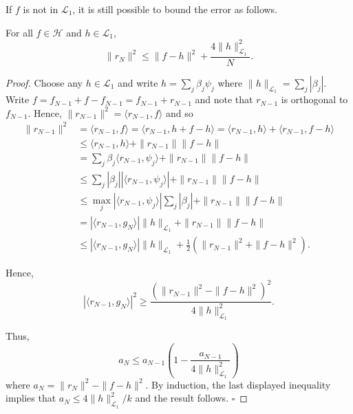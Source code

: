   If $f$ is not in $\mathcal{L}_1$, it is still possible to bound the error as follows.

  \begin{theorem}
    For all $f \in \mathcal{H}$ and $h \in \mathcal{L}_1$,
    \begin{equation}
      \|r_N\|^2 \leq \|f - h\|^2 + \frac{4\|h\|_{\mathcal{L}_1}^2}{N}. \tag{6}
    \end{equation}
  \end{theorem}
  \begin{proof}
    Choose any $h \in \mathcal{L}_1$ and write $h = \sum_j \beta_j \psi_j$ where $\|h\|_{\mathcal{L}_1} = \sum_j |\beta_j|$. Write $f = f_{N-1} + f - f_{N-1} = f_{N-1} + r_{N-1}$ and note that $r_{N-1}$ is orthogonal to $f_{N-1}$. Hence, $\|r_{N-1}\|^2 = \langle r_{N-1}, f \rangle$ and so
    \begin{align}
      \|r_{N-1}\|^2 &= \langle r_{N-1}, f \rangle = \langle r_{N-1}, h + f - h \rangle = \langle r_{N-1}, h \rangle + \langle r_{N-1}, f - h \rangle \\
      &\leq \langle r_{N-1}, h \rangle + \|r_{N-1}\| \|f - h\| \\
      &= \sum_j \beta_j \langle r_{N-1}, \psi_j \rangle + \|r_{N-1}\| \|f - h\| \\
      &\leq \sum_j |\beta_j| |\langle r_{N-1}, \psi_j \rangle| + \|r_{N-1}\| \|f - h\| \\
      &\leq \max_j |\langle r_{N-1}, \psi_j \rangle| \sum_j |\beta_j| + \|r_{N-1}\| \|f - h\| \\
      &= |\langle r_{N-1}, g_N \rangle| \|h\|_{\mathcal{L}_1} + \|r_{N-1}\| \|f - h\| \\
      &\leq |\langle r_{N-1}, g_N \rangle| \|h\|_{\mathcal{L}_1} + \frac{1}{2} (\|r_{N-1}\|^2 + \|f - h\|^2).
    \end{align}

    Hence,
    \begin{equation}
      |\langle r_{N-1}, g_N \rangle|^2 \geq \frac{(\|r_{N-1}\|^2 - \|f - h\|^2)^2}{4\|h\|_{\mathcal{L}_1}^2}.
    \end{equation}

    Thus,
    \begin{equation}
      a_N \leq a_{N-1} \left( 1 - \frac{a_{N-1}}{4\|h\|_{\mathcal{L}_1}^2} \right)
    \end{equation}
    where $a_N = \|r_N\|^2 - \|f - h\|^2$. By induction, the last displayed inequality implies that $a_N \leq 4\|h\|_{\mathcal{L}_1}^2/k$ and the result follows. $\square$
  \end{proof}

